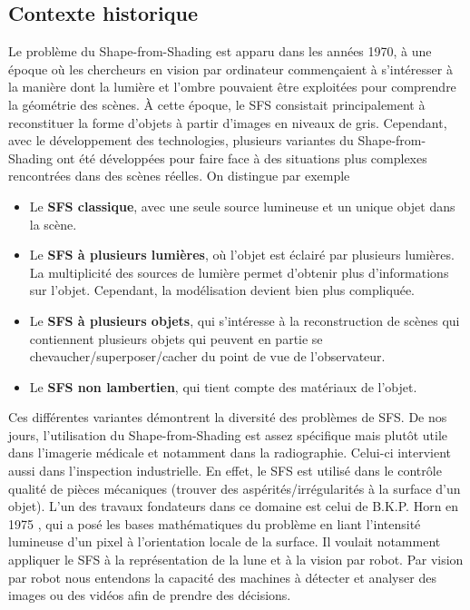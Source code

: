 \subsection{Contexte historique}
Le problème du Shape-from-Shading est apparu dans les années 1970, à une époque où les chercheurs en vision par ordinateur commençaient à s’intéresser à la manière dont la lumière et l’ombre pouvaient être exploitées pour comprendre la géométrie des scènes. À cette époque, le SFS consistait principalement à reconstituer la forme d’objets à partir d’images en niveaux de gris. Cependant, avec le développement des technologies, plusieurs variantes du Shape-from-Shading ont été développées pour faire face à des situations plus complexes rencontrées dans des scènes réelles. On distingue par exemple 
\begin{itemize}
    \item Le \textbf{SFS classique}, avec une seule source lumineuse et un unique objet dans la scène. 
    \item Le \textbf{SFS à plusieurs lumières}, où l'objet est éclairé par plusieurs lumières. La multiplicité des sources de lumière permet d'obtenir plus d'informations sur l'objet. Cependant, la modélisation devient bien plus compliquée.
    \item Le \textbf{SFS à plusieurs objets}, qui s’intéresse à la reconstruction de scènes qui contiennent plusieurs objets qui peuvent en partie se chevaucher/superposer/cacher du point de vue de l'observateur.
    \item Le \textbf{SFS non lambertien}, qui tient compte des matériaux de l'objet. 
\end{itemize}

Ces différentes variantes démontrent la diversité des problèmes de SFS. De nos jours, l'utilisation du Shape-from-Shading est assez spécifique mais plutôt utile dans l'imagerie médicale et notamment dans la radiographie. Celui-ci intervient aussi dans l'inspection industrielle. En effet, le SFS est utilisé dans le contrôle qualité de pièces mécaniques (trouver des aspérités/irrégularités à la surface d'un objet). 
L’un des travaux fondateurs dans ce domaine est celui de B.K.P. Horn en 1975 \cite{Horn 1975}, qui a posé les bases mathématiques du problème en liant l’intensité lumineuse d’un pixel à l’orientation locale de la surface. Il voulait notamment appliquer le SFS à la représentation de la lune et à la vision par robot. Par \og vision par robot \fg{} nous entendons la capacité des machines à détecter et analyser des images ou des vidéos afin de prendre des décisions.


